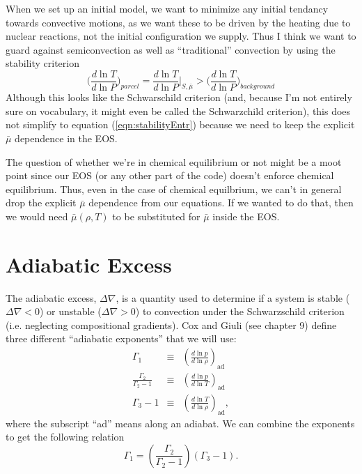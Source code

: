 When we set up an initial model, we want to minimize any initial tendancy 
towards convective motions, as we want these to be driven by the heating due
to nuclear reactions,
not the initial configuration we supply.  Thus I think we want to guard against
semiconvection as well as ``traditional'' convection by using the stability 
criterion
\begin{equation}
\bigg ( \frac{d \ln T}{d \ln P} \bigg )_{parcel} =
\frac{d \ln T}{d \ln P} \bigg |_{S,\bar{\mu}} > 
  \bigg ( \frac{d \ln T}{d \ln P} \bigg )_{background}
\end{equation}
Although this looks like the Schwarschild criterion (and, because I'm not 
entirely sure on vocabulary, it might even be called the Schwarzchild 
criterion), this does not simplify to equation (\ref{eqn:stabilityEntr})
because we need to keep the explicit $\bar{\mu}$ dependence in the EOS.

The question of whether we're in chemical equilibrium or not might be a moot
point since our EOS (or any other part of the code) doesn't enforce chemical 
equilibrium.  Thus, even  
in the case of chemical equilbrium, we can't in general 
drop the explicit $\bar{\mu}$ 
dependence from our equations.  If we wanted to do that, then we would need
$\bar{\mu}(\rho,T)$ to be substituted for $\bar{\mu}$ inside the EOS.


\section{Adiabatic Excess}
\label{Sec:Adiabatic Excess}
The adiabatic excess, $\Delta\nabla$, is a quantity used to determine
if a system is stable ($\Delta\nabla < 0$) or unstable ($\Delta\nabla
> 0$) to convection under the Schwarzschild criterion (i.e. neglecting
compositional gradients).  Cox and Giuli (see chapter 9) define three
different ``adiabatic exponents'' that we will use:
\begin{eqnarray*}
  \Gamma_1 &\equiv&   \left(\frac{d\ln p}{d\ln\rho}\right)_\text{ad} \\
  \frac{\Gamma_2}{\Gamma_2-1} &\equiv& 
  \left(\frac{d\ln p}{d\ln T}\right)_\text{ad} \\
  \Gamma_3 - 1 &\equiv& \left(\frac{d\ln T}{d\ln\rho}\right)_\text{ad},
\end{eqnarray*} 
where the subscript ``ad'' means along an adiabat.  We can combine the
exponents to get the following relation
\begin{equation}\label{eq:Gamma relations}
  \Gamma_1 = \left(\frac{\Gamma_2}{\Gamma_2-1}\right)\left(\Gamma_3-1\right).
\end{equation}

